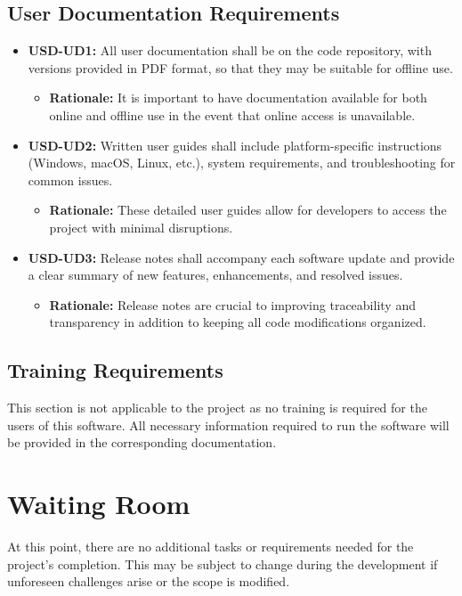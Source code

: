 \documentclass[12pt]{article}
\newcommand{\lips}{\textit{Insert your content here.}}
\begin{document}
\subsection{User Documentation Requirements}
\begin{itemize}
  \item \textbf{USD-UD1:} All user documentation shall be on the code repository, with versions provided in PDF format, so that they may be suitable for offline use.
  \begin{itemize}
    \item \textbf{Rationale:} It is important to have documentation available for both online and offline use in the event that online access is unavailable.
  \end{itemize}
  \item \textbf{USD-UD2:} Written user guides shall include platform-specific instructions (Windows, macOS, Linux, etc.), system requirements, and troubleshooting for common issues.
  \begin{itemize}
    \item \textbf{Rationale:} These detailed user guides allow for developers to access the project with minimal disruptions. 
  \end{itemize}
  \item \textbf{USD-UD3:} Release notes shall accompany each software update and provide a clear summary of new features, enhancements, and resolved issues.
  \begin{itemize}
    \item \textbf{Rationale:} Release notes are crucial to improving traceability and transparency in addition to keeping all code modifications organized.
  \end{itemize}
\end{itemize}

\subsection{Training Requirements}
This section is not applicable to the project as no training is required for the users of this software. All necessary information required to run the software will be provided in the corresponding documentation.
\section{Waiting Room}
At this point, there are no additional tasks or requirements needed for the project's completion. This may be subject to change during the development if unforeseen challenges arise or the scope is modified.
\end{document}
